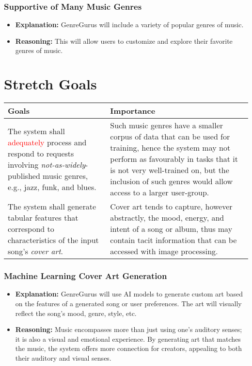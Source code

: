 \documentclass{article}
\begin{document}
\subsubsection*{Supportive of Many Music Genres}
\begin{itemize}
    \item \textbf{Explanation:} GenreGurus will include a variety of popular genres of music.
    \item \textbf{Reasoning:} This will allow users to customize and explore their favorite genres of music.
\end{itemize}


\section{Stretch Goals}
\begin{table}[h]
    \centering
    \begin{tabular}{|| p{} | p{} ||}
        \hline
        \textbf{Goals} & \textbf{Importance} \\
        \hline
        The system shall \textcolor{red}{adequately} process and respond to 
        requests involving \emph{not-as-widely}-published music genres, e.g., 
        jazz, funk, and blues. & Such music genres have a smaller corpus of 
        data that can be used for training, hence the system may not perform 
        as favourably in tasks that it is not very well-trained on, but the 
        inclusion of such genres would allow access to a larger user-group. \\
        \hline
        The system shall generate tabular features that correspond to 
        characteristics of the input song's \emph{cover art}. & Cover art tends 
        to capture, however abstractly, the mood, energy, and intent of a song 
        or album, thus may contain tacit information that can be accessed with 
        image processing. \\
        \hline
    \end{tabular}
\end{table}

\subsubsection*{Machine Learning Cover Art Generation}
\begin{itemize}
    \item \textbf{Explanation:} GenreGurus will use AI models to generate custom art based on the features of a generated song or user preferences. The art will visually reflect the song's mood, genre, style, etc.
    \item \textbf{Reasoning:} Music encompasses more than just using one's auditory senses; it is also a visual and emotional experience. By generating art that matches the music, the system offers more connection for creators, appealing to both their auditory and visual senses.
\end{itemize}
\end{document}
